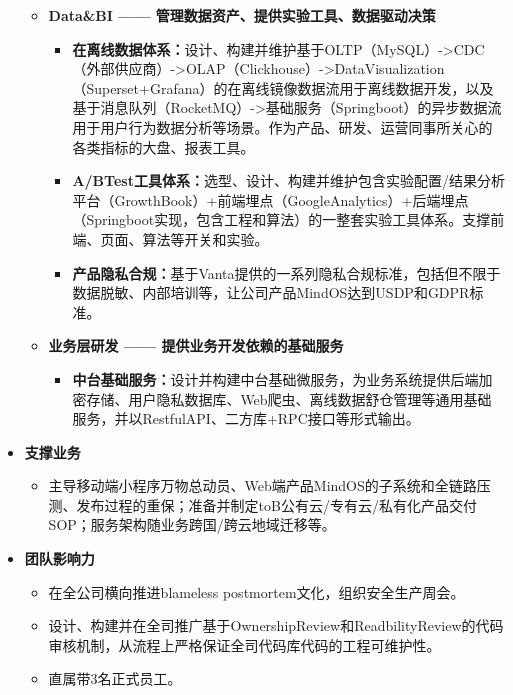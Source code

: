 \documentclass[letterpaper,11pt]{article}
\begin{document}
\begin{spacing}{1.0}
\begin{itemize}
\begin{itemize}
				\item \textbf{Data\&BI —— 管理数据资产、提供实验工具、数据驱动决策}
				\begin{itemize}
					\item     \textbf{在离线数据体系：}设计、构建并维护基于OLTP（MySQL）->CDC（外部供应商）->OLAP（Clickhouse）->DataVisualization（Superset+Grafana）的在离线镜像数据流用于离线数据开发，以及基于消息队列（RocketMQ）->基础服务（Springboot）的异步数据流用于用户行为数据分析等场景。作为产品、研发、运营同事所关心的各类指标的大盘、报表工具。
					\item
					\textbf{A/BTest工具体系：}选型、设计、构建并维护包含实验配置/结果分析平台（GrowthBook）+前端埋点（GoogleAnalytics）+后端埋点（Springboot实现，包含工程和算法）的一整套实验工具体系。支撑前端、页面、算法等开关和实验。
					\item
					\textbf{产品隐私合规：}基于Vanta提供的一系列隐私合规标准，包括但不限于数据脱敏、内部培训等，让公司产品MindOS达到USDP和GDPR标准。
				\end{itemize}
				
				\item \textbf{业务层研发 —— 提供业务开发依赖的基础服务}
				\begin{itemize}
					\item \textbf{中台基础服务：}设计并构建中台基础微服务，为业务系统提供后端加密存储、用户隐私数据库、Web爬虫、离线数据舒仓管理等通用基础服务，并以RestfulAPI、二方库+RPC接口等形式输出。
				\end{itemize}
			\end{itemize}
			\item \textbf{支撑业务}
			\begin{itemize}
				\item 主导移动端小程序万物总动员、Web端产品MindOS的子系统和全链路压测、发布过程的重保；准备并制定toB公有云/专有云/私有化产品交付SOP；服务架构随业务跨国/跨云地域迁移等。
			\end{itemize}
			\item \textbf{团队影响力}
			\begin{itemize}
				\item 在全公司横向推进blameless postmortem文化，组织安全生产周会。
				\item 设计、构建并在全司推广基于OwnershipReview和ReadbilityReview的代码审核机制，从流程上严格保证全司代码库代码的工程可维护性。
				\item 直属带3名正式员工。
			\end{itemize}
		\end{itemize}
		

\end{spacing}
\end{document}
